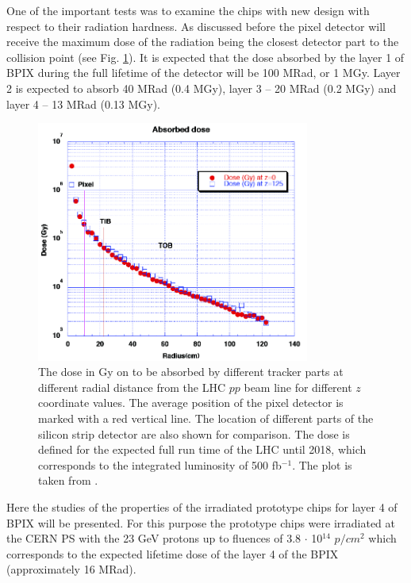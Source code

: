 One of the important tests was to examine the chips with new design with respect to their radiation hardness. As discussed before the
pixel detector will receive the maximum dose of the radiation being the closest detector part to the collision point (see Fig. \ref{fig:irrad_dose}).
It is expected that the dose absorbed by the layer 1 of BPIX during the full lifetime of the detector will be 100 MRad, or 1 MGy. Layer 2 is 
expected to absorb 40 MRad (0.4 MGy), layer 3 -- 20 MRad (0.2 MGy) and layer 4 -- 13 MRad (0.13 MGy).

\begin{figure}[t]
 \centering
 \includegraphics[width=0.8\textwidth]{021_pixel_upgrade/plots/irradiation_dose.png}
 \caption{The dose in Gy on to be absorbed by different tracker parts at different radial distance from the LHC $pp$ beam line for different
 $z$ coordinate values. The average position of the pixel detector is marked with a red vertical line. The location of different parts of the 
 silicon strip detector are also shown for comparison. The dose is defined for the expected full run time of the LHC until 2018, which 
 corresponds to the integrated luminosity of 500 fb$^{-1}$. The plot is taken from \cite{CMS:2012sda}.}
 \label{fig:irrad_dose}
\end{figure}

Here the studies of the properties of the irradiated prototype chips for layer 4 of BPIX will be presented. For this purpose the prototype
chips were irradiated at the CERN PS \cite{CERNTB} with the 23 GeV protons up to fluences of 3.8 $\cdot$ 10$^{14}$ $p/cm^{2}$ which corresponds to 
the expected lifetime dose of the layer 4 of the BPIX (approximately 16 MRad). 

